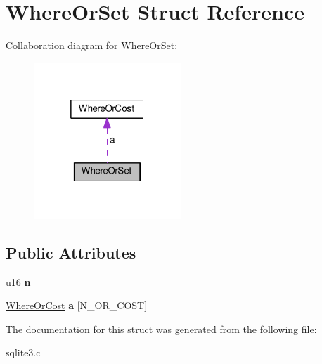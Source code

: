 \hypertarget{structWhereOrSet}{}\section{Where\+Or\+Set Struct Reference}
\label{structWhereOrSet}


Collaboration diagram for Where\+Or\+Set\+:\nopagebreak
\begin{figure}[H]
\begin{center}
\leavevmode
\includegraphics[width=157pt]{structWhereOrSet__coll__graph}
\end{center}
\end{figure}
\subsection*{Public Attributes}
\begin{DoxyCompactItemize}
\item 
u16 {\bfseries n}\hypertarget{structWhereOrSet_ac5fce5cb06eb3e01a77efe6643acd618}{}\label{structWhereOrSet_ac5fce5cb06eb3e01a77efe6643acd618}

\item 
\hyperlink{structWhereOrCost}{Where\+Or\+Cost} {\bfseries a} \mbox{[}N\+\_\+\+O\+R\+\_\+\+C\+O\+ST\mbox{]}\hypertarget{structWhereOrSet_a2e78a14bf6f34f266a2ae2d046c7ba80}{}\label{structWhereOrSet_a2e78a14bf6f34f266a2ae2d046c7ba80}

\end{DoxyCompactItemize}


The documentation for this struct was generated from the following file\+:\begin{DoxyCompactItemize}
\item 
sqlite3.\+c\end{DoxyCompactItemize}
